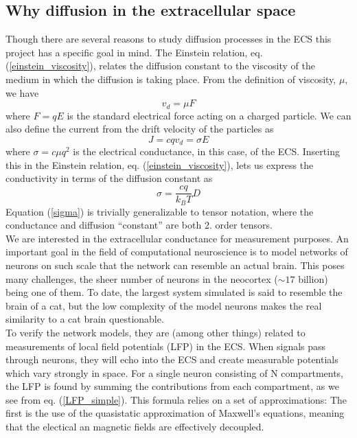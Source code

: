 \documentclass[a4paper,english, 12pt, twoside]{article}
\begin{document}
\subsection{Why diffusion in the extracellular space}
Though there are several reasons to study diffusion processes in the ECS this project has a specific goal in mind. 
The Einstein relation, eq. (\ref{einstein_viscosity}), relates the diffusion constant to the viscosity of the medium in which the diffusion is taking place. 
From the definition of viscosity, $\mu$, we have 
\begin{equation}
v_d = \mu F 
\end{equation}
where $F = qE$ is the standard electrical force acting on a charged particle. 
We can also define the current from the drift velocity of the particles as 
\begin{equation}
J = cqv_d = \sigma E 
\end{equation}
where $\sigma = c\mu q^2$ is the electrical conductance, in this case, of the ECS. 
Inserting this in the Einstein relation, eq. (\ref{einstein_viscosity}), lets us express the conductivity in terms of the diffusion constant as 
\begin{equation}\label{sigma}
\sigma = \frac{cq}{k_B T}D 
\end{equation}
Equation (\ref{sigma}) is trivially generalizable to tensor notation, where the conductance and diffusion ``constant'' are both 2. order tensors.\\
We are interested in the extracellular conductance for measurement purposes. 
An important goal in the field of computational neuroscience is to model networks of neurons on such scale that the network can resemble an actual brain. 
This poses many challenges, the sheer number of neurons in the neocortex ($\sim 17$ billion) being one of them. 
To date, the largest system simulated is said to resemble the brain of a cat, but the low complexity of the model neurons makes the real similarity to a cat brain questionable. \\
To verify the network models, they are (among other things) related to measurements of local field potentials (LFP) in the ECS. 
When signals pass through neurons, they will echo into the ECS and create measurable potentials which vary strongly in space. 
For a single neuron consisting of N compartments, the LFP is found by summing the contributions from each compartment, as we see from eq. (\ref{LFP_simple}). 
This formula relies on a set of approximations: The first is the use of the quasistatic approximation of Maxwell's equations, meaning that the electical an magnetic fields are effectively decoupled. 
\end{document}
